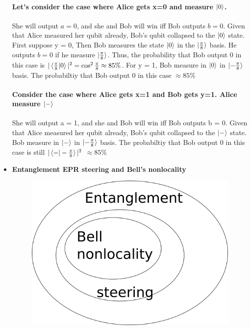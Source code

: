 \documentclass[]{article}
\theoremstyle{nonumberplain}
\begin{document}
\begin{itemize}
\\
\textbf{Let's consider the case where Alice gets x=0 and measure $\ket{0}$.}\\ \\ She will output $a=0$, and she and Bob will win iff Bob outputs  $b=0$. Given that Alice measured her qubit already, Bob's qubit collapsed to the  $\ket{0}$ state. First suppose y = 0, Then Bob measures the state $\ket{0}$ in the  $\ket{\frac{\pi}{8}}$ basis. He outputs $b=0$ if he measure $\ket{\frac{\pi}{8}}$. Thus, the probability that Bob output 0 in this case is $|\braket{\frac{\pi}{8}|0}|^{2}=\cos^{2}{\frac{\pi}{8}}\approx 85\%$. For y = 1, Bob measure in $\ket{0}$ in $\ket{-\frac{\pi}{8}}$ basis. The probabiltiy that Bob output 0 in this case $\approx 85\%$ \\ \\
\textbf{Consider the case where Alice gets x=1 and Bob gets y=1. Alice measure $\ket{-}$} \\ \\ She will output a = 1, and she and Bob will win iff Bob outputs b = 0. Given that Alice measured her qubit already, Bob's qubit collapsed to the  $\ket{-}$ state. Bob measure in $\ket{-}$ in $\ket{-\frac{\pi}{8}}$ basis. The probabiltiy that Bob output 0 in this case is still $|\braket{-|-\frac{\pi}{8}}|^{2}$ $\approx 85\%$ \\
\item \textbf{Entanglement EPR steering and Bell's nonlocality}
\begin{figure}[h]
\centering
\includegraphics[scale=0.4]{graph/6.png}
\end{figure}
\begin{itemize}

\end{itemize}
\end{itemize}
\end{document}
